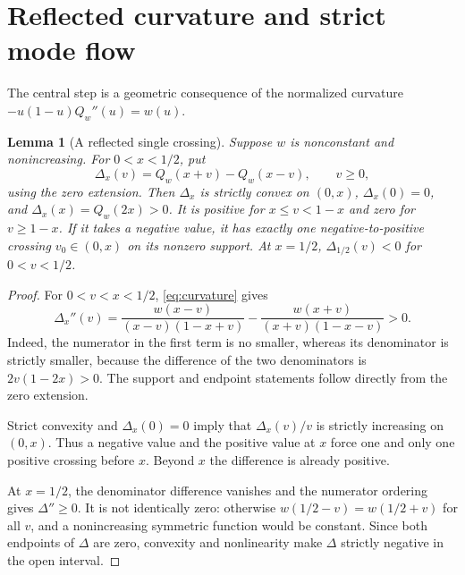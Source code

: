 \documentclass[11pt]{article}
\numberwithin{equation}{section}
\newtheorem{lemma}[theorem]{Lemma}
\theoremstyle{definition}
\theoremstyle{remark}
\newcommand{\Qw}{Q_w}
\begin{document}
\section{Reflected curvature and strict mode flow}
\label{sec:reflection}
The central step is a geometric consequence of the normalized curvature
$-u(1-u)\Qw''(u)=w(u)$.

\begin{lemma}[A reflected single crossing]\label{lem:reflection}
Suppose $w$ is nonconstant and nonincreasing. For $0<x<1/2$, put
\begin{equation}\label{eq:Delta}
 \Delta_x(v)=\Qw(x+v)-\Qw(x-v),\qquad v\ge0,
\end{equation}
using the zero extension. Then $\Delta_x$ is strictly convex on $(0,x)$,
$\Delta_x(0)=0$, and $\Delta_x(x)=\Qw(2x)>0$.
It is positive for $x\le v<1-x$ and zero for $v\ge1-x$.
If it takes a negative value, it has exactly one negative-to-positive
crossing $v_0\in(0,x)$ on its nonzero support.
At $x=1/2$, $\Delta_{1/2}(v)<0$ for $0<v<1/2$.
\end{lemma}
\begin{proof}
For $0<v<x<1/2$, \eqref{eq:curvature} gives
\begin{equation}\label{eq:Delta-curvature}
 \Delta_x''(v)=
 \frac{w(x-v)}{(x-v)(1-x+v)}
 -\frac{w(x+v)}{(x+v)(1-x-v)}>0.
\end{equation}
Indeed, the numerator in the first term is no smaller, whereas its
denominator is strictly smaller, because the difference of the two
denominators is $2v(1-2x)>0$. The support and endpoint statements
follow directly from the zero extension.

Strict convexity and $\Delta_x(0)=0$ imply that
$\Delta_x(v)/v$ is strictly increasing on $(0,x)$. Thus a negative value
and the positive value at $x$ force one and only one positive crossing
before $x$. Beyond $x$ the difference is already positive.

At $x=1/2$, the denominator difference vanishes and the numerator
ordering gives $\Delta''\ge0$. It is not identically zero: otherwise
$w(1/2-v)=w(1/2+v)$ for all $v$, and a nonincreasing symmetric function
would be constant. Since both endpoints of $\Delta$ are zero, convexity
and nonlinearity make $\Delta$ strictly negative in the open interval.
\end{proof}
\end{document}
